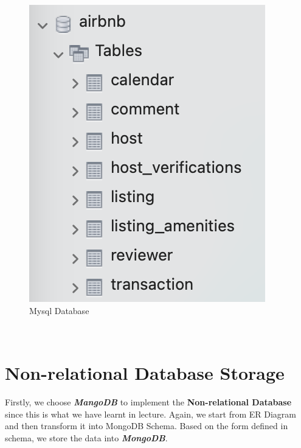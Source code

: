 \documentclass{article}
\begin{document}
	\begin{figure}[h]
		\centering
		\includegraphics[width=.2\textheight]{mysql_db.png}
		\caption{Mysql Database}
		\label{fig:014}
	\end{figure}
	\\
	\section{Non-relational Database Storage}
	Firstly, we choose \textbf{\textit{MangoDB}} to implement the \textbf{Non-relational Database} since this is what we have learnt in lecture. Again, we start from ER Diagram and then transform it into MongoDB Schema. Based on the form defined in schema, we store the data into \textbf{\textit{MongoDB}}.
\end{document}
